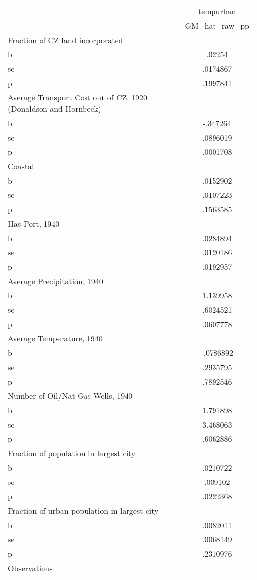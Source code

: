 \begin{tabular}{l*{1}{c}}
\toprule
                &tempurban\\
                &GM\_hat\_raw\_pp\\
\midrule
Fraction of CZ land incorporated&         \\
b               &   .02254\\
se              & .0174867\\
p               & .1997841\\
\midrule
Average Transport Cost out of CZ, 1920 (Donaldson and Hornbeck)&         \\
b               & -.347264\\
se              & .0896019\\
p               & .0001708\\
\midrule
Coastal         &         \\
b               & .0152902\\
se              & .0107223\\
p               & .1563585\\
\midrule
Has Port, 1940  &         \\
b               & .0284894\\
se              & .0120186\\
p               & .0192957\\
\midrule
Average Precipitation, 1940&         \\
b               & 1.139958\\
se              & .6024521\\
p               & .0607778\\
\midrule
Average Temperature, 1940&         \\
b               &-.0786892\\
se              & .2935795\\
p               & .7892546\\
\midrule
Number of Oil/Nat Gas Wells, 1940&         \\
b               & 1.791898\\
se              & 3.468063\\
p               & .6062886\\
\midrule
Fraction of population in largest city&         \\
b               & .0210722\\
se              &  .009102\\
p               & .0222368\\
\midrule
Fraction of urban population in largest city&         \\
b               & .0082011\\
se              & .0068149\\
p               & .2310976\\
\midrule
Observations    &         \\
\bottomrule
\end{tabular}

